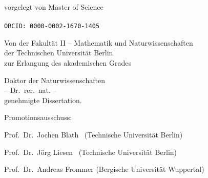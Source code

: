 \begin{titlepage}
  \null
  \vspace{1cm}
  \begin{center}
    \huge\sffamily\bfseries
    \doctitle
  \end{center}
  \begin{center}
    \Large\sffamily\bfseries
    \docsubtitle
  \end{center}
  \vspace{0.75cm}
  \begin{center}
    vorgelegt von Master of Science\\
    \medskip
    {\sffamily\bfseries\Large\docauthor}\\
    \medskip
    \texttt{ORCID: 0000-0002-1670-1405}
  \end{center}
  \vspace{0.75cm}
  \begin{center}
    Von der Fakult\"at II -- Mathematik und Naturwissenschaften\\
    der Technischen Universit\"at Berlin\\
    zur Erlangung des akademischen Grades\\

    \medskip

    Doktor der Naturwissenschaften\\
    -- Dr.\ rer.\ nat. --\\

    \medskip
    genehmigte Dissertation.
  \end{center}
  \vspace{0.75cm}
  \begin{center}
    \begin{varwidth}{\textwidth}
      Promotionsausschuss: %
      \begin{description}[style=multiline,
                          leftmargin=3.5cm,font=\normalfont,noitemsep]
        \item[Vorsitzender:] Prof.\ Dr.\ Jochen Blath \hspace{0.53cm} \ (Technische Universit\"at Berlin)
        \item[1. Gutachter:] Prof.\ Dr.\ J\"org Liesen \hspace{0.81cm} \ (Technische Universit\"at Berlin)
        \item[2. Gutachter:] Prof.\ Dr.\ Andreas Frommer \hspace{0.1cm} (Bergische Universität Wuppertal)
      \end{description}


\end{varwidth}
\end{center}
\end{titlepage}

